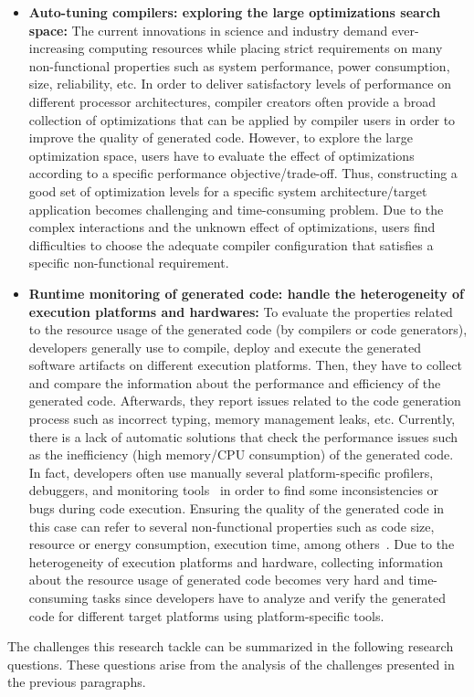 \begin{itemize}
\item
\textbf{Auto-tuning compilers: exploring the large optimizations search space:} The current innovations in science and industry demand ever-increasing computing resources while placing strict requirements on many non-functional properties such as system performance, power consumption, size, reliability, etc. In order to deliver satisfactory levels of performance on different processor architectures, compiler creators often provide a broad collection of optimizations that can be applied by compiler users in order to improve the quality of generated code. However, to explore the large optimization space, users have to evaluate the effect of optimizations according to a specific performance objective/trade-off. Thus, constructing a good set of optimization levels for a specific system architecture/target application becomes challenging and time-consuming problem. Due to the complex interactions and the unknown effect of optimizations, users find difficulties to choose the adequate compiler configuration that satisfies a specific non-functional requirement.

\item
\textbf{Runtime monitoring of generated code: handle the heterogeneity of execution platforms and hardwares:} To evaluate the properties related to the resource usage of the generated code (by compilers or code generators), developers generally use to compile, deploy and execute the generated software artifacts on different execution platforms. Then, they have to collect and compare the information about the performance and efficiency of the generated code. Afterwards, they report issues related to the code generation process such as incorrect typing, memory management leaks, etc.
	Currently, there is a lack of automatic solutions that check the performance issues such as the inefficiency (high memory/CPU consumption) of the generated code. In fact, developers often use manually several platform-specific profilers, debuggers, and monitoring tools~\cite{guana2014chaintracker,delgado2004taxonomy} in order to find some inconsistencies or bugs during code execution. Ensuring the quality of the generated code in this case can refer to several non-functional properties such as code size, resource or energy consumption, execution time, among others~\cite{pan2006fast}. Due to the heterogeneity of execution platforms and hardware, collecting information about the resource usage of generated code becomes very hard and time-consuming tasks since developers have to analyze and verify the generated code for different target platforms using platform-specific tools. 


\end{itemize}
The challenges this research tackle can be summarized in the following research questions. These questions arise from the analysis of the challenges presented in the previous paragraphs.

